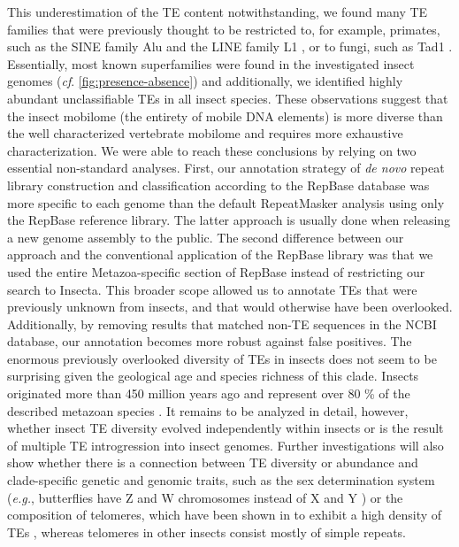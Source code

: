 This underestimation of the TE content notwithstanding, we found many TE
families that were previously thought to be restricted to, for example,
primates, such as the SINE family Alu \citep{Kriegs2007} and the LINE
family L1 \citep{Liu2003}, or to fungi, such as Tad1
\citep{Cambareri1994}. Essentially, most known superfamilies were found
in the investigated insect genomes (\emph{cf}.
\ref{fig:presence-absence}) and additionally, we identified highly
abundant unclassifiable TEs in all insect species.  These observations
suggest that the insect mobilome (the entirety of mobile DNA elements)
is more diverse than the well characterized vertebrate mobilome
\citep{Chalopin2015} and requires more exhaustive characterization. We
were able to reach these conclusions by relying on two essential
non-standard analyses. First, our annotation strategy of \emph{de novo}
repeat library construction and classification according to the RepBase
database was more specific to each genome than the default RepeatMasker
analysis using only the RepBase reference library.  The latter approach
is usually done when releasing a new genome assembly to the public. The
second difference between our approach and the conventional application
of the RepBase library was that we used the entire Metazoa-specific
section of RepBase instead of restricting our search to Insecta. This
broader scope allowed us to annotate TEs that were previously unknown
from insects, and that would otherwise have been overlooked.
Additionally, by removing results that matched non-TE sequences in the
NCBI database, our annotation becomes more robust against false
positives. The enormous previously overlooked diversity of TEs in
insects does not seem to be surprising given the geological age and
species richness of this clade. Insects originated more than 450 million
years ago \citep{Misof2014} and represent over 80 \% of the described
metazoan species \citep{Grimaldi2005}. It remains to be analyzed in
detail, however, whether insect TE diversity evolved independently
within insects or is the result of multiple TE introgression into insect
genomes. Further investigations will also show whether there is a
connection between TE diversity or abundance and clade-specific genetic
and genomic traits, such as the sex determination system (\emph{e.g.},
butterflies have Z and W chromosomes instead of X and Y
\citep{Traut1997}) or the composition of telomeres, which have been
shown in  to exhibit a high density of TEs
\citep{Levis1993}, whereas telomeres in other insects consist mostly of
simple repeats.

